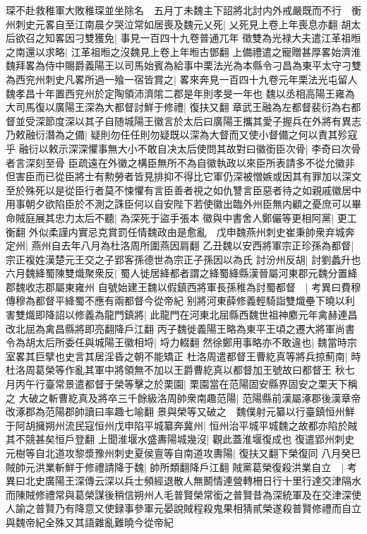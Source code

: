琛不赴救稚軍大敗稚琛並坐除名　五月丁未魏主下詔將北討内外戒嚴既而不行　衡州刺史元畧自至江南晨夕哭泣常如居喪及魏元乂死|{
	乂死見上卷上年喪息亦翻}
胡太后欲召之知畧因刁雙獲免|{
	事見一百四十九卷普通兀年}
徵雙為光禄大夫遣江革祖暅之南還以求略|{
	江革祖暅之沒魏見上卷上年暅古鄧翻}
上備禮遣之寵贈甚厚畧始濟淮魏拜畧為侍中賜爵義陽王以司馬始賓為給事中栗法光為本縣令刁昌為東平太守刁雙為西兖州刺史凡畧所過一飱一宿皆賞之|{
	畧來奔見一百四十九卷元年栗法光屯留人魏孝昌十年置西兖州於定陶領沛濟隂二郡是年則孝旻一年也}
魏以丞相高陽王雍為大司馬復以廣陽王深為大都督討鮮于修禮|{
	復扶又翻}
章武王融為左都督裴衍為右都督並受深節度深以其子自随城陽王徽言於太后曰廣陽王攜其愛子握兵在外將有異志乃敕融衍潛為之備|{
	疑則勿任任則勿疑既以深為大督而又使小督備之何以責其殄寇乎}
融衍以敕示深深懼事無大小不敢自决太后使問其故對曰徽銜臣次骨|{
	李奇曰次骨者言深刻至骨}
臣疏遠在外徽之構臣無所不為自徽執政以來臣所表請多不從允徽非但害臣而已從臣將士有勲勞者皆見排抑不得比它軍仍深被憎嫉或因其有罪加以深文至於殊死以是從臣行者莫不悚懼有言臣善者視之如仇讐言臣惡者待之如親戚徽居中用事朝夕欲陷臣於不測之誅臣何以自安陛下若使徽出臨外州臣無内顧之憂庶可以畢命賊庭展其忠力太后不聽|{
	為深死于盜手張本}
徽與中書舍人鄭儼等更相阿黨|{
	更工衡翻}
外似柔謹内實忌克賞罰任情魏政由是愈亂　戊申魏燕州刺史崔秉帥衆弃城奔定州|{
	燕州自去年八月為杜洛周所圍燕因肩翻}
乙丑魏以安西將軍宗正珍孫為都督|{
	宗正複姓漢楚元王交之子郢客孫德世為宗正子孫因以為氏}
討汾州反胡|{
	討劉蠡升也}
六月魏絳蜀陳雙熾聚衆反|{
	蜀人徙居絳都者謂之絳蜀絳縣漢晉屬河東郡元魏分置絳郡魏收志郡屬東雍州}
自號始建王魏以假鎮西將軍長孫稚為討蜀都督　|{
	考異曰費穆傳穆為都督平絳蜀不應有兩都督今從帝紀}
别將河東薛修義輕騎詣雙熾壘下曉以利害雙熾即降詔以修義為龍門鎮將|{
	此龍門在河東北屈縣西魏世祖神䴥元年禽赫連昌改北屈為禽昌縣將即亮翻降戶江翻}
丙子魏徙義陽王略為東平王頃之遷大將軍尚書令為胡太后所委任與城陽王徽相埒|{
	埒力輟翻}
然徐鄭用事略亦不敢違也|{
	魏當時宗室畧其巨擘也史言其居淫昏之朝不能矯正}
杜洛周遣都督王曹紇真等將兵掠薊南|{
	時杜洛周葛榮等作亂其軍中將領無不加以王爵曹紇真以都督加王號故曰都督王}
秋七月丙午行臺常景遣都督于榮等擊之於栗園|{
	栗園當在范陽固安縣界固安之栗天下稱之}
大破之斬曹紇真及將卒三千餘級洛周帥衆南趣范陽|{
	范陽縣前漢屬涿郡後漢章帝改涿郡為范陽郡帥讀曰率趣七喻翻}
景與榮等又破之　魏僕射元纂以行臺鎮恒州鮮于阿胡擁朔州流民寇恒州戊申陷平城纂奔冀州|{
	恒州治平城平城魏之故都亦陷於賊其不競甚矣恒戶登翻}
上聞淮堰水盛夀陽城幾沒|{
	觀此蓋淮堰復成也}
復遣郢州刺史元樹等自北道攻黎漿豫州刺史夏侯亶等自南道攻夀陽|{
	復扶又翻下榮復同}
八月癸巳賊帥元洪業斬鮮于修禮請降于魏|{
	帥所類翻降戶江翻}
賊黨葛榮復殺洪業自立　|{
	考異曰北史廣陽王深傳云深以兵士頻經退散人無鬭情連營轉柵日行十里行達交津隔水而陳賊修禮常與葛榮謀後稍信朔州人毛普賢榮常銜之普賢昔為深統軍及在交津深使人諭之普賢乃有降意又使録事參軍元晏說賊程殺鬼果相猜貳榮遂殺普賢修禮而自立與魏帝紀全殊又其語雜亂難曉今從帝紀}
